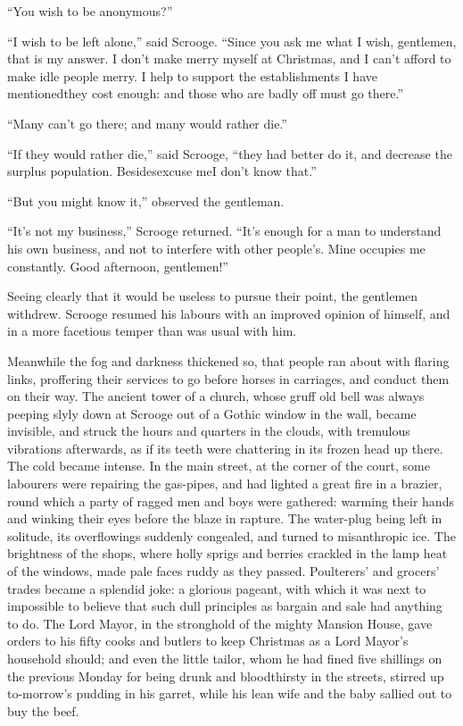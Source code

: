 \documentclass[paper=5.5in:8.5in,BCOR=5mm,twoside,DIV=calc,12pt,usegeometry]{scrbook} %
\begin{document}
\enquote{You wish to be anonymous?}

\enquote{I wish to be left alone,} said Scrooge. \enquote{Since you ask me what I wish, gentlemen, that is my answer. I don't make merry myself at Christmas, and I can't afford to make idle people merry. I help to support the establishments I have mentioned\textemdash they cost enough: and those who are badly off must go there.}

\enquote{Many can't go there; and many would rather die.}

\enquote{If they would rather die,} said Scrooge, \enquote{they had better do it, and decrease the surplus population. Besides\textemdash excuse me\textemdash I don't know that.}

\enquote{But you might know it,} observed the gentleman.

\enquote{It's not my business,} Scrooge returned. \enquote{It's enough for a man to understand his own business, and not to interfere with other people's. Mine occupies me constantly. Good afternoon, gentlemen!}

Seeing clearly that it would be useless to pursue their point, the gentlemen withdrew. Scrooge resumed his labours with an improved opinion of himself, and in a more facetious temper than was usual with him.

Meanwhile the fog and darkness thickened so, that people ran about with flaring links, proffering their services to go before horses in carriages, and conduct them on their way. The ancient tower of a church, whose gruff old bell was always peeping slyly down at Scrooge out of a Gothic window in the wall, became invisible, and struck the hours and quarters in the clouds, with tremulous vibrations afterwards, as if its teeth were chattering in its frozen head up there. The cold became intense. In the main street, at the corner of the court, some labourers were repairing the gas-pipes, and had lighted a great fire in a brazier, round which a party of ragged men and boys were gathered: warming their hands and winking their eyes before the blaze in rapture. The water-plug being left in solitude, its overflowings suddenly congealed, and turned to misanthropic ice. The brightness of the shops, where holly sprigs and berries crackled in the lamp heat of the windows, made pale faces ruddy as they passed. Poulterers' and grocers' trades became a splendid joke: a glorious pageant, with which it was next to impossible to believe that such dull principles as bargain and sale had anything to do. The Lord Mayor, in the stronghold of the mighty Mansion House, gave orders to his fifty cooks and butlers to keep Christmas as a Lord Mayor's household should; and even the little tailor, whom he had fined five shillings on the previous Monday for being drunk and bloodthirsty in the streets, stirred up to-morrow's pudding in his garret, while his lean wife and the baby sallied out to buy the beef.
\end{document}

